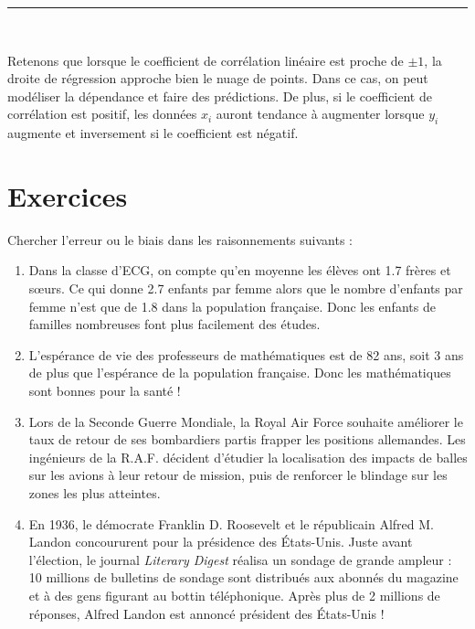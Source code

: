 \documentclass[../PolyS4.tex]{subfiles}
\begin{document}
\vspace{1em}
\hrule
\vspace{1em}

\begin{Rmq}$\,$

Retenons que lorsque le coefficient de corrélation linéaire est proche de $\pm 1$, la droite de régression approche bien le nuage de points. Dans ce cas, on peut modéliser la dépendance et faire des prédictions. De plus, si le coefficient de corrélation est positif, les données $x_i$ \og  auront tendance \fg{}  à augmenter lorsque $y_i$ augmente et inversement si le coefficient est négatif.
\end{Rmq}

\newpage
\section{Exercices}



Chercher l'erreur ou le biais dans les raisonnements suivants :

\begin{enumerate}
    \item Dans la classe d'ECG, on compte qu'en moyenne les élèves ont 1.7 frères et sœurs. Ce qui donne 2.7 enfants par femme alors que le nombre d'enfants par femme n'est que de 1.8 dans la population française. Donc les enfants de familles nombreuses font plus facilement des études.
    
    \item L'espérance de vie des professeurs de mathématiques est de 82 ans, soit 3 ans de plus que l'espérance de la population française. Donc les mathématiques sont bonnes pour la santé !
    
    \item Lors de la Seconde Guerre Mondiale, la Royal Air Force souhaite améliorer le taux de retour de ses bombardiers partis frapper les positions allemandes. Les ingénieurs de la R.A.F. décident d'étudier la localisation des impacts de balles sur les avions à leur retour de mission, puis de renforcer le blindage sur les zones les plus atteintes.
    
    \item En 1936, le démocrate Franklin D. Roosevelt et le républicain Alfred M. Landon concoururent pour la présidence des États-Unis. Juste avant l'élection, le journal \textit{Literary Digest} réalisa un sondage de grande ampleur : 10 millions de bulletins de sondage sont distribués aux abonnés du magazine et à des gens figurant au bottin téléphonique. Après plus de 2 millions de réponses, Alfred Landon est annoncé président des États-Unis !
\end{enumerate}
\end{document}
